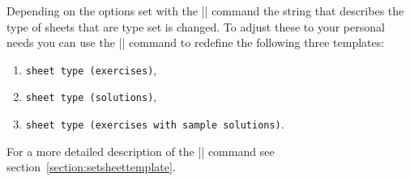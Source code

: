 \documentclass[a4paper,fleqn]{report}
\begin{document}
Depending on the options set with the |\sheetconf| command the string
that describes the type of sheets that are type set is changed. To
adjust these to your personal needs you can use the
|\setsheettemplate| command to redefine the following three templates:
\begin{enumerate}
  \item \lstinline[language={}]|sheet type (exercises)|,
  \item \lstinline[language={}]|sheet type (solutions)|,
  \item \lstinline[language={}]|sheet type (exercises with sample solutions)|.
\end{enumerate}
For a more detailed description of the |\setsheettemplate| command see
section~\ref{section:setsheettemplate}.
\end{document}
